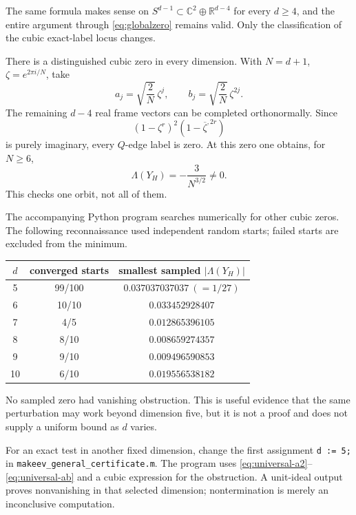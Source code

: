 \documentclass[11pt,reqno]{amsart}
\theoremstyle{remark}
\newcommand{\R}{\mathbb R}
\newcommand{\C}{\mathbb C}
\newcommand{\abs}[1]{\left\lvert #1\right\rvert}
\begin{document}
The same formula makes sense on
$S^{d-1}\subset\C^2\oplus\R^{d-4}$ for every $d\ge4$, and the entire argument
through \eqref{eq:globalzero} remains valid.  Only the classification of the
cubic exact-label locus changes.

There is a distinguished cubic zero in every dimension.  With
$N=d+1$, $\zeta=e^{2\pi i/N}$, take
\[
 a_j=\sqrt{\frac2N}\,\zeta^j,\qquad
 b_j=\sqrt{\frac2N}\,\zeta^{2j}.
\]
The remaining $d-4$ real frame vectors can be completed orthonormally.  Since
\[
 (1-\zeta^r)^2(1-\overline\zeta^{,2r})
\]
is purely imaginary, every $Q$-edge label is zero.  At this zero one obtains,
for $N\ge6$,
\[
 \Lambda(Y_H)=-\frac{3}{N^{3/2}}\ne0.
\]
This checks one orbit, not all of them.

The accompanying Python program searches numerically for other cubic zeros.
The following reconnaissance used independent random starts; failed starts are
excluded from the minimum.
\begin{center}
\begin{tabular}{c@{\qquad}c@{\qquad}c}
\toprule
$d$&converged starts&smallest sampled $\abs{\Lambda(Y_H)}$\\
\midrule
5&99/100&$0.037037037037\ (=1/27)$\\
6&10/10&$0.033452928407$\\
7&4/5&$0.012865396105$\\
8&8/10&$0.008659274357$\\
9&9/10&$0.009496590853$\\
10&6/10&$0.019556538182$\\
\bottomrule
\end{tabular}
\end{center}
No sampled zero had vanishing obstruction.  This is useful evidence that the
same perturbation may work beyond dimension five, but it is not a proof and
does not supply a uniform bound as $d$ varies.

For an exact test in another fixed dimension, change the first assignment
\texttt{d := 5;} in \texttt{makeev\_general\_certificate.m}.  The program
uses \eqref{eq:universal-a2}--\eqref{eq:universal-ab} and a cubic expression
for the obstruction.  A unit-ideal output proves nonvanishing in that selected
dimension; nontermination is merely an inconclusive computation.
\end{document}
